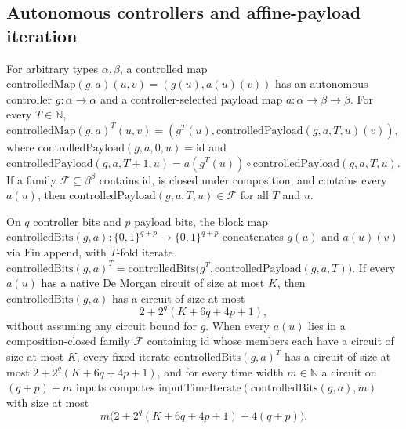 \begin{result}
\subsection{Autonomous controllers and affine-payload iteration}
For arbitrary types $\alpha,\beta$, a controlled map
$\mathrm{controlledMap}(g,a)(u,v)=(g(u),a(u)(v))$ has an autonomous controller
$g:\alpha\to\alpha$ and a controller-selected payload map
$a:\alpha\to\beta\to\beta$. For every $T\in\mathbb N$,
$\mathrm{controlledMap}(g,a)^T(u,v)=(g^T(u),\mathrm{controlledPayload}(g,a,T,u)(v))$,
where $\mathrm{controlledPayload}(g,a,0,u)=\mathrm{id}$ and
$\mathrm{controlledPayload}(g,a,T+1,u)=a(g^T(u))\circ\mathrm{controlledPayload}(g,a,T,u)$.
If a family $\mathcal F\subseteq\beta^\beta$ contains $\mathrm{id}$, is closed under
composition, and contains every $a(u)$, then
$\mathrm{controlledPayload}(g,a,T,u)\in\mathcal F$ for all $T$ and $u$.

On $q$ controller bits and $p$ payload bits, the block map
$\mathrm{controlledBits}(g,a):\{0,1\}^{q+p}\to\{0,1\}^{q+p}$ concatenates $g(u)$ and
$a(u)(v)$ via $\mathrm{Fin.append}$, with $T$-fold iterate
$\mathrm{controlledBits}(g,a)^T=\mathrm{controlledBits}\bigl(g^T,\mathrm{controlledPayload}(g,a,T)\bigr)$.
If every $a(u)$ has a native De Morgan circuit of size at most $K$, then
$\mathrm{controlledBits}(g,a)$ has a circuit of size at most
\[
2+2^q(K+6q+4p+1),
\]
without assuming any circuit bound for $g$. When every $a(u)$ lies in a
composition-closed family $\mathcal F$ containing $\mathrm{id}$ whose members each
have a circuit of size at most $K$, every fixed iterate
$\mathrm{controlledBits}(g,a)^T$ has a circuit of size at most
$2+2^q(K+6q+4p+1)$, and for every time width $m\in\mathbb N$ a circuit on
$(q+p)+m$ inputs computes $\mathrm{inputTimeIterate}(\mathrm{controlledBits}(g,a),m)$
with size at most
\[
m\bigl(2+2^q(K+6q+4p+1)+4(q+p)\bigr).
\]


\end{result}
